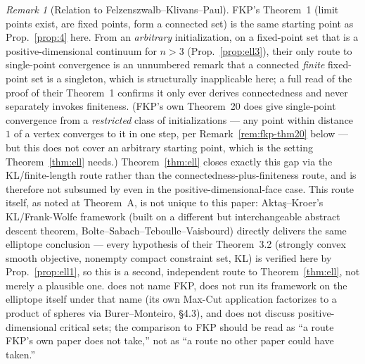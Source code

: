 \documentclass[11pt]{article}
\theoremstyle{plain}
\theoremstyle{definition}
\theoremstyle{remark}
\newtheorem{remark}[theorem]{Remark}
\begin{document}
\begin{remark}[Relation to Felzenszwalb--Klivans--Paul]
FKP's Theorem~1 (limit points exist, are fixed points, form a connected
set) is the same starting point as Prop.~\ref{prop:4} here. From an
\emph{arbitrary} initialization, on a fixed-point set that is a
positive-dimensional continuum for $n>3$ (Prop.~\ref{prop:ell3}), their
only route to single-point convergence is an unnumbered remark that a
connected \emph{finite} fixed-point set is a singleton, which is
structurally
inapplicable here; a full read of the proof of their Theorem~1 confirms it
only ever derives connectedness and never separately invokes finiteness.
(FKP's own Theorem~20 does give single-point convergence from a
\emph{restricted} class of initializations --- any point within distance
$1$ of a vertex converges to it in one step, per
Remark~\ref{rem:fkp-thm20} below --- but this does not cover an arbitrary
starting point, which is the setting Theorem~\ref{thm:ell} needs.)
Theorem~\ref{thm:ell} closes exactly this gap via the KL/finite-length
route \cite{ABS13} rather than the connectedness-plus-finiteness route,
and is therefore not subsumed by \cite{FKP21} even in the
positive-dimensional-face case. This route itself, as noted at Theorem~A,
is not unique to this paper: Aktaş--Kroer's \cite{AK25} KL/Frank-Wolfe
framework (built on a different but interchangeable abstract descent
theorem, Bolte--Sabach--Teboulle--Vaisbourd) directly delivers the same
elliptope conclusion --- every hypothesis of their Theorem~3.2 (strongly
convex smooth objective, nonempty compact constraint set, KL) is verified
here by Prop.~\ref{prop:ell1}, so this is a second, independent route to
Theorem~\ref{thm:ell}, not merely a plausible one. \cite{AK25} does not
name FKP, does not run its framework on the elliptope itself under that
name (its own Max-Cut application factorizes to a product of spheres via
Burer--Monteiro, \S4.3), and does not discuss positive-dimensional
critical sets; the comparison to FKP should be read as ``a route FKP's own
paper does not take,'' not as ``a route no other paper could have taken.''
\end{remark}
\end{document}
